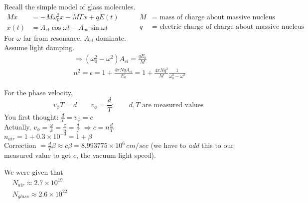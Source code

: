 \documentclass[twoside,10pt]{amsart}
\begin{document}
Recall the simple model of glass molecules.  
\[
\begin{aligned}
  M\ddot{x} & = - M \omega_0^2 x - M \Gamma \dot{x} + qE(t) \\
  x(t) & = A_{el} \cos{\omega t} + A_{ab} \sin{\omega t} 
\end{aligned} \quad \quad \, 
\begin{aligned}
  M & = \text{ mass of charge about massive nucleus } \\
  q & = \text{ electric charge of charge about massive nucleus } 
\end{aligned}
\]
For $\omega$ far from resonance, $A_{el}$ dominate.  \\
Assume light damping.  
\[
\begin{gathered}
  \Longrightarrow (\omega_0^2 - \omega^2) A_{el} = \frac{qE_0}{M}  \\
  n^2 = \epsilon = 1 + \frac{4 \pi Nq A_{el}}{E_0}  = 1 + \frac{ 4\pi N q^2 }{M} \frac{1}{ \omega_0^2 - \omega^2 }
\end{gathered}
\]

For the phase velocity,
\[
v_{\phi} T = d \quad \quad v_{\phi} = \frac{d}{T}; \quad \quad d,T \text{ are measured values } 
\]
You first thought: $\frac{d}{T} = v_{\phi} = c$ \\
Actually, $v_{\phi} = \frac{\omega}{k} = \frac{c}{n} = \frac{d}{T}$ $\Longrightarrow c= n \frac{d}{T}$ \medskip \\
$n_{air} = 1 + 0.3 \times 10^{-3} = 1+\beta$ \medskip \\
Correction $=\frac{d}{T} \beta \approx c \beta = 8.993775 \times 10^6 \, cm/sec$ (we have to \emph{add} this to our measured value to get $c$, the vacuum light speed).  

We were given that \\
$\begin{aligned}
  & N_{air} \approx 2.7 \times 10^{19} \\
  & N_{glass} \approx 2.6 \times 10^{22}
\end{aligned}$
\end{document}
